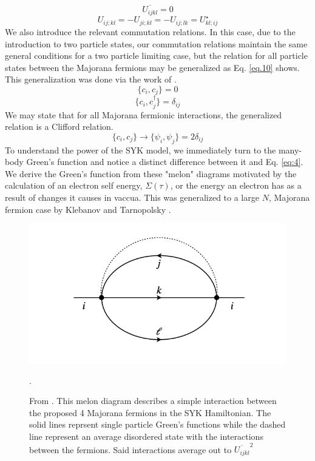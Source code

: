 \documentclass[reprint]{revtex4-2}
\begin{document}
\begin{equation}
       \overline{U_{ijkl}} = 0 
\end{equation}
\begin{equation}
      U_{ij;kl} = -U_{ji;kl} = -U_{ij;lk} = U^{\star}_{kl;ij}    
\end{equation}
We also introduce the relevant commutation relations. In this case, due to the introduction to two particle states, our commutation relations maintain the same general conditions for a two particle limiting case, but the relation for all particle states between the Majorana fermions may be generalized as Eq. \ref{eq.10} shows. This generalization was done via the work of \cite{Polchinski_2016}.
\begin{equation}
    \{c_{i},c_{j}\} = 0
\end{equation}
\begin{equation}
    \{c_{i}, c_{j}^{\dagger}\} = \delta_{ij}
\end{equation}
We may state that for all Majorana fermionic interactions, the generalized relation is a Clifford relation.
\begin{equation} \label{eq.10}
    \{c_{i}, c_{j}\} \rightarrow \{\psi_{i}, \psi_{j}\} = 2\delta_{ij}
\end{equation}
To understand the power of the SYK model, we immediately turn to the many-body Green's function and notice a distinct difference between it and Eq. \ref{eq:4}. We derive the Green's function from these "melon" diagrams motivated by the calculation of an electron self energy, $\Sigma(\tau)$,  or the energy an electron has as a result of changes it causes in vaccua. This was generalized to a large $N$, Majorana fermion case by Klebanov and Tarnopolsky \cite{Klebanov_2017}. 
\begin{figure}[H]
    \centering
    \includegraphics[scale = 0.7]{Melon Diagram.png}
    \caption{From \cite{Klebanov_2017}. This melon diagram describes a simple interaction between the proposed 4 Majorana fermions in the SYK Hamiltonian. The solid lines reprsent single particle Green's functions while the dashed line represent an average disordered state with the interactions between the fermions. Said interactions average out to $\overline{U_{ijkl}}^{2}$ }.
    \label{fig:2}
\end{figure}
\end{document}
